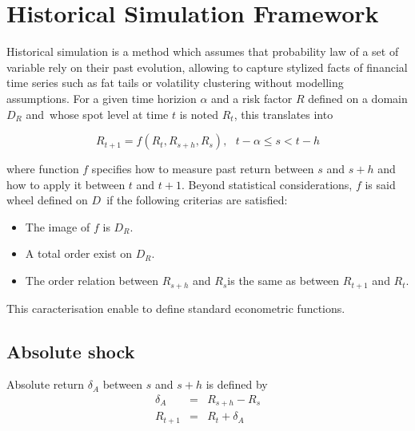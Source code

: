 \documentclass[3pt]{article}
\begin{document}
\bigskip 

\bigskip 

\bigskip 

\bigskip 

\bigskip 

\bigskip 

\bigskip 

\bigskip 

\section{Historical Simulation Framework}

Historical simulation is a method which assumes that probability law of a
set of variable rely on their past evolution, allowing to capture stylized
facts of financial time series such as fat tails or volatility clustering
without modelling assumptions. For a given time horizion $\alpha $ and a
risk factor $R$ defined on a domain $D_{R}$ and\ whose spot level at time $t$
is noted $R_{t}$, this translates into

\begin{equation*}
R_{t+1}=f(R_{t},R_{s+h},R_{s}),\text{ \ \ }t-\alpha \leq s<t-h
\end{equation*}

where function $f$ specifies how to measure past return between $s$ and $s+h$
and how to apply it between $t$ and $t+1.$ Beyond statistical
considerations, $f$ is said wheel defined on $D$\ if the following criterias
are satisfied:

\bigskip

\begin{itemize}
\item The image of $f$ is $D_{R}.$

\item A total order exist on $D_{R}.$

\item The order relation between $R_{s+h}$ and $R_{s}$is the same as between 
$R_{t+1}$ and $R_{t}.$
\end{itemize}

This caracterisation enable to define standard econometric functions.

\subsection{Absolute shock}

Absolute return $\delta _{A}$ between $s$ and $s+h$ is defined by%
\begin{eqnarray*}
\delta _{A} &=&R_{s+h}-R_{s} \\
R_{t+1} &=&R_{t}+\delta _{A}
\end{eqnarray*}
\end{document}
